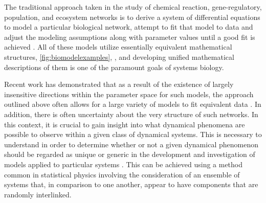 The traditional approach taken in the study of chemical reaction, gene-regulatory, population, and ecosystem networks is to derive a system of differential equations to model a particular biological network, attempt to fit that model to data and adjust the modeling assumptions along with parameter values until a good fit is achieved \cite{Meyer2014}. All of these models utilize essentially equivalent mathematical structures, \ref{fig:biomodelexamples}, \cite{RossCr2003,Palsson2011a,Sauro2012}, and developing unified mathematical descriptions of them is one of the paramount goals of systems biology.

Recent work has demonstrated that as a result of the existence of largely insensitive directions within the parameter space for such models, the approach outlined above often allows for a large variety of models to fit equivalent data \cite{Machta2013,Hines2014,Prabakaran2014,Tonsing2014}. In addition, there is often uncertainty about the very structure of such networks. In this context, it is crucial to gain insight into what dynamical phenomena are possible to observe within a given class of dynamical systems. This is necessary to understand in order to determine whether or not a given dynamical phenomenon should be regarded as unique or generic in the development and investigation of models applied to particular systems \cite{Gunawardena2013,Gunawardena2014}. This can be achieved using a method common in statistical physics involving the consideration of an ensemble of systems that, in comparison to one another, appear to have components that are randomly interlinked.


